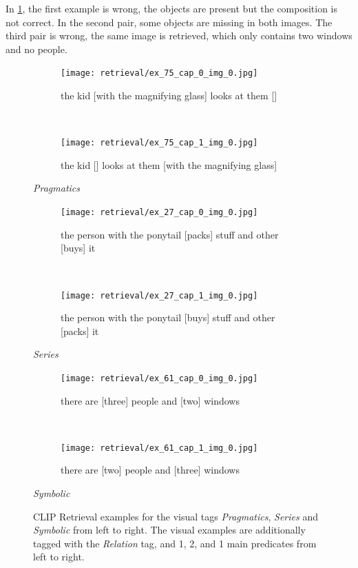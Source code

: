 In \cref{fig:retrieval-examples-visual}, the first example is wrong, the objects are present but the composition is not correct. In the second pair, some objects are missing in both images. The third pair is wrong, the same image is retrieved, which only contains two windows and no people.

\begin{figure}[ht]
\centering
    \begin{minipage}{.30\textwidth}
        \begin{subfigure}{\textwidth}
        \centering
        \texttt{[image: retrieval/ex\_75\_cap\_0\_img\_0.jpg]}
        \caption{the kid [with the magnifying glass] looks at them []}
        \end{subfigure}\\
        \begin{subfigure}{\textwidth}
        \centering
        \texttt{[image: retrieval/ex\_75\_cap\_1\_img\_0.jpg]}
        \caption{the kid [] looks at them [with the magnifying glass]}
        \end{subfigure}%
        \caption*{\textit{Pragmatics}}
    \end{minipage}
    \hfill
    \begin{minipage}{.30\textwidth}
        \begin{subfigure}{\textwidth}
        \centering
        \texttt{[image: retrieval/ex\_27\_cap\_0\_img\_0.jpg]}
        \caption{the person with the ponytail [packs] stuff and other [buys] it}
        \end{subfigure}\\
        \begin{subfigure}{\textwidth}
        \centering
        \texttt{[image: retrieval/ex\_27\_cap\_1\_img\_0.jpg]}
        \caption{the person with the ponytail [buys] stuff and other [packs] it}
        \end{subfigure}%
        \caption*{\textit{Series}}
    \end{minipage}
    \hfill
    \begin{minipage}{.30\textwidth}
        \begin{subfigure}{\textwidth}
        \centering
        \texttt{[image: retrieval/ex\_61\_cap\_0\_img\_0.jpg]}
        \caption{there are [three] people and [two] windows}
        \end{subfigure}\\
        \begin{subfigure}{\textwidth}
        \centering
        \texttt{[image: retrieval/ex\_61\_cap\_1\_img\_0.jpg]}
        \caption{there are [two] people and [three] windows}
        \end{subfigure}%
        \caption*{\textit{Symbolic}}
    \end{minipage}
    \caption{CLIP Retrieval examples for the visual tags \textit{Pragmatics}, \textit{Series} and \textit{Symbolic} from left to right. The visual examples are additionally tagged with the \textit{Relation} tag, and 1, 2, and 1 main predicates from left to right.}
    \label{fig:retrieval-examples-visual}
\end{figure}

